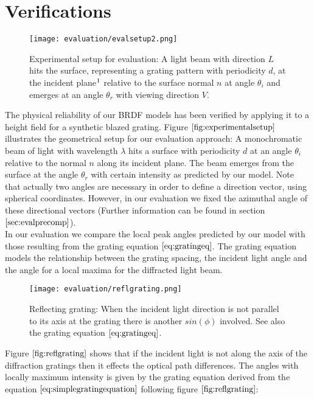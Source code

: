 \section{Verifications}
\label{sec:approachesverifications}
\begin{figure}[H]
  \centering
  \texttt{[image: evaluation/evalsetup2.png]}
  \caption[Experimental Setup]{Experimental setup for evaluation: A light beam with direction $L$ hits the surface, representing a grating pattern with periodicity $d$, at the incident plane$\footnotemark$ relative to the surface normal $n$ at angle $\theta_i$ and emerges at an angle $\theta_r$ with viewing direction $V$.}
  \label{fig:experimentalsetup}
\end{figure}

The physical reliability of our BRDF models has been verified by applying it to a height field for a synthetic blazed grating. Figure $\ref{fig:experimentalsetup}$ illustrates the geometrical setup for our evaluation approach: A monochromatic beam of light with wavelength $\lambda$ hits a surface with periodicity $d$ at an angle $\theta_i$ relative to the normal $n$ along its incident plane. The beam emerges from the surface at the angle $\theta_r$ with certain intensity as predicted by our model. Note that actually two angles are necessary in order to define a direction vector, using spherical coordinates. However, in our evaluation we fixed the azimuthal angle of these directional vectors (Further information can be found in section $\ref{sec:evalprecomp}$). \\

In our evaluation we compare the local peak angles predicted by our model with those resulting from the grating equation $\ref{eq:gratingeq}$. The grating equation models the relationship between the grating spacing, the incident light angle and the angle for a local maxima for the diffracted light beam. 

\begin{figure}[H]
  \centering
  \texttt{[image: evaluation/reflgrating.png]}
  \caption[Reflective Grating]{Reflecting grating: When the incident light direction is not parallel to its axis at the grating there is another $sin(\phi)$ involved. See also the grating equation $\ref{eq:gratingeq}$.}
  \label{fig:reflgrating}
\end{figure}
\noindent
Figure $\ref{fig:reflgrating}$ shows that if the incident light is not along the axis of the diffraction gratings then it effects the optical path differences. The angles with locally maximum intensity is given by the grating equation derived from the equation $\ref{eq:simplegratingequation}$ following figure $\ref{fig:reflgrating}$: 

